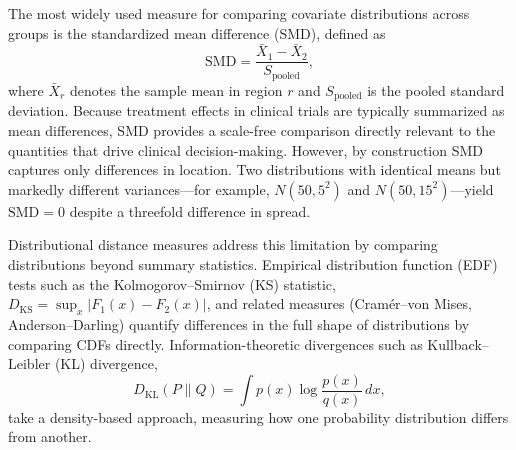 \documentclass[AMA,Times1COL]{WileyNJDv5}
\begin{document}
The most widely used measure for comparing covariate distributions across groups is the standardized mean difference (SMD), defined as
\begin{equation}
\text{SMD} = \frac{\bar{X}_1 - \bar{X}_2}{S_{\text{pooled}}},
\label{eq:smd}
\end{equation}
where $\bar{X}_r$ denotes the sample mean in region $r$ and $S_{\text{pooled}}$ is the pooled standard deviation.\cite{austin2011} Because treatment effects in clinical trials are typically summarized as mean differences, SMD provides a scale-free comparison directly relevant to the quantities that drive clinical decision-making. However, by construction SMD captures only differences in location. Two distributions with identical means but markedly different variances---for example, $N(50, 5^2)$ and $N(50, 15^2)$---yield $\text{SMD} = 0$ despite a threefold difference in spread.

Distributional distance measures address this limitation by comparing distributions beyond summary statistics. Empirical distribution function (EDF) tests such as the Kolmogorov--Smirnov (KS) statistic, $D_{\text{KS}} = \sup_x |F_1(x) - F_2(x)|$, and related measures (Cram\'{e}r--von Mises, Anderson--Darling) quantify differences in the full shape of distributions by comparing CDFs directly. Information-theoretic divergences such as Kullback--Leibler (KL) divergence,
\begin{equation}
D_{\text{KL}}(P \| Q) = \int p(x) \log \frac{p(x)}{q(x)} \, dx,
\label{eq:kl}
\end{equation}
take a density-based approach, measuring how one probability distribution differs from another.
\end{document}
